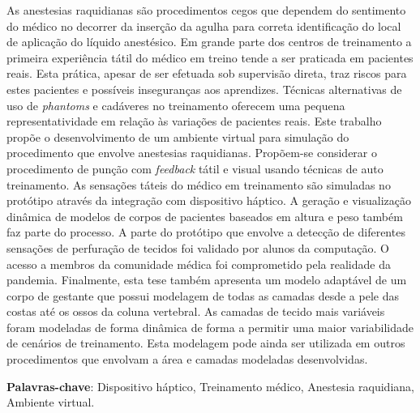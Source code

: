 \begin{resumo}

As anestesias raquidianas são procedimentos cegos que dependem do sentimento do médico no decorrer da inserção da agulha para correta identificação do local de aplicação do líquido anestésico. Em grande parte dos centros de treinamento a primeira experiência tátil do médico em treino tende a ser praticada em pacientes reais. Esta prática, apesar de ser efetuada sob supervisão direta, traz riscos para estes pacientes e possíveis inseguranças aos aprendizes. Técnicas alternativas de uso de \textit{phantoms} e cadáveres no treinamento oferecem uma pequena representatividade em relação às variações de pacientes reais. 
Este trabalho propõe o desenvolvimento de um ambiente virtual para simulação do procedimento que envolve anestesias raquidianas. Propõem-se considerar o procedimento de punção com \textit{feedback} tátil e visual usando técnicas de auto treinamento. As sensações táteis do médico em treinamento são simuladas no protótipo através da integração com dispositivo háptico. A geração e visualização dinâmica de modelos de corpos de pacientes baseados em altura e peso também faz parte do processo. A parte do protótipo que envolve a detecção de diferentes sensações de perfuração de tecidos foi validado por alunos da computação. O acesso a membros da comunidade médica foi comprometido pela realidade da pandemia. Finalmente, esta tese  também apresenta um modelo adaptável de um corpo de gestante que possui modelagem de todas as camadas desde a pele das costas até os ossos da coluna vertebral. As camadas de tecido mais variáveis foram modeladas de forma dinâmica de forma a permitir uma maior variabilidade de cenários de treinamento. Esta modelagem pode ainda ser utilizada em outros procedimentos que envolvam a área e camadas modeladas desenvolvidas. 

{\hspace{-8mm} \bf{Palavras-chave}}: Dispositivo háptico, Treinamento médico, Anestesia raquidiana, Ambiente virtual.

\end{resumo}

